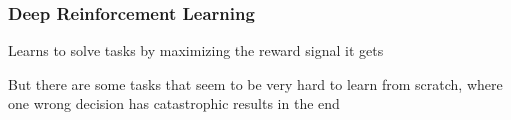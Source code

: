 \begin{frame}
    \frametitle{Deep Reinforcement Learning}

\begin{PraesentationAufzaehlung}
    \item Learns to solve tasks by maximizing the reward signal it gets
    \item But there are some tasks that seem to be very hard to learn from scratch, where one wrong decision has catastrophic results in the end
\end{PraesentationAufzaehlung}

\end{frame}
\clearpage


